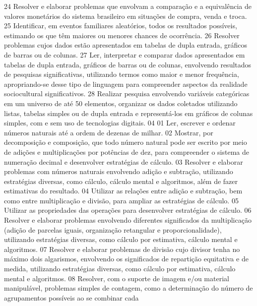 {{{			}
			{24}{%
				Resolver e elaborar problemas que envolvam a comparação e a equivalência de
				valores monetários do sistema brasileiro em situações de compra, venda e troca.
			}
			{25}{%
				Identificar, em eventos familiares aleatórios, todos os resultados possíveis,
				estimando os que têm maiores ou menores chances de ocorrência.
			}
			{26}{%
				Resolver problemas cujos dados estão apresentados em tabelas de dupla
				entrada, gráficos de barras ou de colunas.
			}
			{27}{%
				Ler, interpretar e comparar dados apresentados em tabelas de dupla entrada,
				gráficos de barras ou de colunas, envolvendo resultados de pesquisas significativas, utilizando
				termos como maior e menor frequência, apropriando-se desse tipo de linguagem para
				compreender aspectos da realidade sociocultural significativos.
			}
			{28}{%
				Realizar pesquisa envolvendo variáveis categóricas em um universo de até 50
				elementos, organizar os dados coletados utilizando listas, tabelas simples ou de dupla entrada
				e representá-los em gráficos de colunas simples, com e sem uso de tecnologias digitais.
			}
	}
	{04}{%
		{01}{%
				Ler, escrever e ordenar números naturais até a ordem de dezenas de milhar.
			}
			{02}{%
				Mostrar, por decomposição e composição, que todo número natural pode ser escrito
				por meio de adições e multiplicações por potências de dez, para compreender o sistema de
				numeração decimal e desenvolver estratégias de cálculo.
			}
			{03}{%
				Resolver e elaborar problemas com números naturais envolvendo adição e subtração,
				utilizando estratégias diversas, como cálculo, cálculo mental e algoritmos, além de fazer estimativas
				do resultado.
			}
			{04}{%
				Utilizar as relações entre adição e subtração, bem como entre multiplicação e divisão,
				para ampliar as estratégias de cálculo.
			}
			{05}{%
				Utilizar as propriedades das operações para desenvolver estratégias de cálculo.
			}
			{06}{%
				Resolver e elaborar problemas envolvendo diferentes significados da multiplicação
				(adição de parcelas iguais, organização retangular e proporcionalidade), utilizando estratégias
				diversas, como cálculo por estimativa, cálculo mental e algoritmos.
			}
			{07}{%
				Resolver e elaborar problemas de divisão cujo divisor tenha no máximo dois algarismos,
				envolvendo os significados de repartição equitativa e de medida, utilizando estratégias diversas,
				como cálculo por estimativa, cálculo mental e algoritmos.
			}
			{08}{%
				Resolver, com o suporte de imagem e/ou material manipulável, problemas simples
				de contagem, como a determinação do número de agrupamentos possíveis ao se combinar cada
}}}

